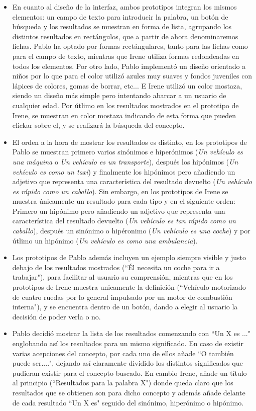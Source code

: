 \begin{itemize}
	\item En cuanto al diseño de la interfaz, ambos prototipos integran los mismos elementos: un campo de texto para introducir la palabra, un botón de búsqueda y los resultados se muestran en forma de lista, agrupando los distintos resultados en rectángulos, que a partir de ahora denominaremos fichas.
	Pablo ha optado por formas rectángulares, tanto para las fichas como para el campo de texto, mientras que Irene utiliza formas redondeadas en todos los elementos. 
	Por otro lado, Pablo implementó un diseño orientado a niños por lo que para el color utilizó azules muy suaves y fondos juveniles con lápices de colores, gomas de borrar, etc... E Irene utilizó un color mostaza, siendo un diseño más simple pero intentando abarcar a un usuario de cualquier edad.	Por útlimo en los resultados mostrados en el prototipo de Irene, se muestran en color mostaza indicando de esta forma que pueden clickar sobre el, y se realizará la búsqueda del concepto.
	\item El orden a la hora de mostrar los resultados es distinto, en los prototipos de Pablo se muestran primero varios sinónimos e hiperónimos (\textit{Un vehículo es una máquina} o \textit{Un vehículo es un transporte}), después los hipónimos (\textit{Un vehículo es como un taxi}) y finalmente los hipónimos pero añadiendo un adjetivo que representa una característica del resultado devuelto (\textit{Un vehículo es rápido como un caballo}). Sin embargo, en los prototipos de Irene se muestra únicamente un resultado para cada tipo y en el siguiente orden: Primero un hipónimo pero añadiendo un adjetivo que representa una característica del resultado devuelto (\textit{Un vehículo es tan rápido como un caballo}), después un sinónimo o hipéronimo (\textit{Un vehículo es una coche}) y por útlimo un hipónimo (\textit{Un vehículo es como una ambulancia}).
	\item Los prototipos de Pablo además incluyen un ejemplo siempre visible y justo debajo de los resultados mostrados (``Él necesita un coche para ir a trabajar"), para facilitar al usuario su comprensión, mientras que en los prototipos de Irene muestra unicamente la definición (``Vehículo motorizado de cuatro ruedas por lo general impulsado por un motor de combustión interna"), y se encuentra dentro de un botón, dando a elegir al usuario la decisión de poder verla o no.
	\item Pablo decidió mostrar la lista de los resultados comenzando con ``Un X es ..." englobando así los resultados para un mismo significado. En caso de existir varias acepciones del concepto, por cada uno de ellos añade ``O también puede ser....", dejando así claramente dividido los distintos significados que pudieran existir para el concepto buscado. En cambio Irene, añade un título al principio (``Resultados para la palabra X") donde queda claro que los resultados que se obtienen son para dicho concepto y además añade delante de cada resultado ``Un X es" seguido del sinónimo, hiperónimo o hipónimo.

\end{itemize}
